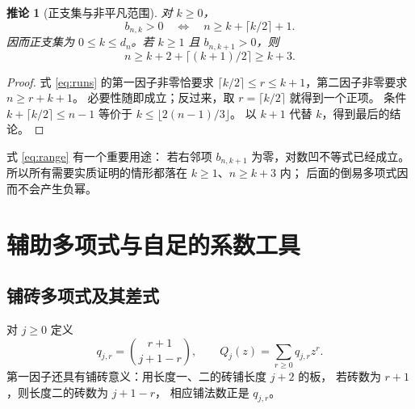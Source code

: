 \documentclass[UTF8,a4paper,11pt,fontset=none]{ctexart}
\numberwithin{equation}{section}
\theoremstyle{paperplain}
\newtheorem{corollary}[theorem]{推论}
\theoremstyle{definition}
\theoremstyle{remark}
\begin{document}
\begin{corollary}[正支集与非平凡范围]\label{cor:support}
对 $k\ge0$，
\begin{equation}\label{eq:support}
b_{n,k}>0\quad\Longleftrightarrow\quad
n\ge k+\lceil k/2\rceil+1.
\end{equation}
因而正支集为 $0\le k\le d_n$。若 $k\ge1$ 且 $b_{n,k+1}>0$，则
\begin{equation}\label{eq:range}
n\ge k+2+\lceil(k+1)/2\rceil\ge k+3.
\end{equation}
\end{corollary}
\begin{proof}
式 \eqref{eq:runs} 的第一因子非零恰要求
$\lceil k/2\rceil\le r\le k+1$，第二因子非零要求 $n\ge r+k+1$。
必要性随即成立；反过来，取 $r=\lceil k/2\rceil$ 就得到一个正项。
条件 $k+\lceil k/2\rceil\le n-1$ 等价于 $k\le\lfloor2(n-1)/3\rfloor$。
以 $k+1$ 代替 $k$，得到最后的结论。
\end{proof}

式 \eqref{eq:range} 有一个重要用途：
若右邻项 $b_{n,k+1}$ 为零，对数凹不等式已经成立。
所以所有需要实质证明的情形都落在 $k\ge1$、$n\ge k+3$ 内；
后面的倒易多项式因而不会产生负幂。

\section{辅助多项式与自足的系数工具}\label{sec:tools}
\subsection{铺砖多项式及其差式}
对 $j\ge0$ 定义
\begin{equation}\label{eq:Q}
q_{j,r}=\binom{r+1}{j+1-r},\qquad
Q_j(z)=\sum_{r\ge0}q_{j,r}z^r.
\end{equation}
第一因子还具有铺砖意义：用长度一、二的砖铺长度 $j+2$ 的板，
若砖数为 $r+1$，则长度二的砖数为 $j+1-r$，
相应铺法数正是 $q_{j,r}$。
\end{document}
